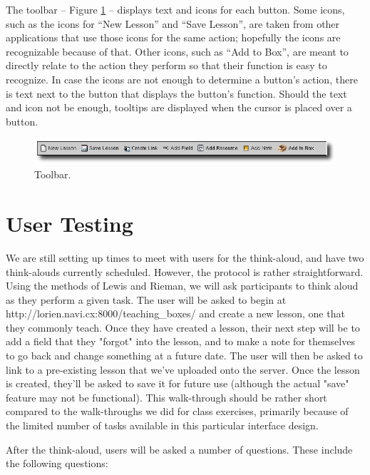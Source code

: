 \documentclass[10pt,letter]{article}
\begin{document}
The toolbar -- Figure \ref{fig: toolbar ss} -- displays text and icons for each
button. Some icons, such as the icons for ``New Lesson'' and ``Save Lesson'',
are taken from other applications that use those icons for the same action;
hopefully the icons are recognizable because of that. Other icons, such as ``Add
to Box'', are meant to directly relate to the action they perform so that their
function is easy to recognize. In case the icons are not enough to determine a
button's action, there is text next to the button that displays the button's
function. Should the text and icon not be enough, tooltips are displayed when
the cursor is placed over a button.

\begin{figure}[htb]
	\centering
	\includegraphics[width=0.9\linewidth]{figures/toolbar}
	\caption{Toolbar.}
	\label{fig: toolbar ss}
\end{figure}

\section{User Testing}
We are still setting up times to meet with users for the think-aloud, and have
two think-alouds currently scheduled.  However, the protocol is rather
straightforward.  Using the methods of Lewis and Rieman, we will ask
participants to think aloud as they perform a given task.  The user will be
asked to begin at http://lorien.navi.cx:8000/teaching\_boxes/ and create a new
lesson, one that they commonly teach.  Once they have created a lesson, their
next step will be to add a field that they "forgot" into the lesson, and to make
a note for themselves to go back and change something at a future date.  The
user will then be asked to link to a pre-existing lesson that we've uploaded
onto the server.  Once the lesson is created, they'll be asked to save it for
future use (although the actual "save" feature may not be functional).  This
walk-through should be rather short compared to the walk-throughs we did for
class exercises, primarily because of the limited number of tasks available in
this particular interface design.

After the think-aloud, users will be asked
a number of questions.  These include the following questions:
\end{document}
